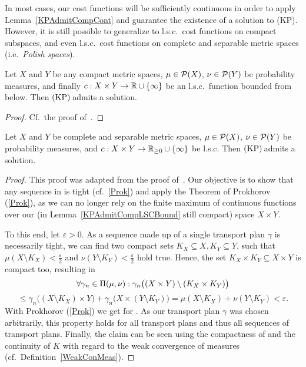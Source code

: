 In most cases, our cost functions will be sufficiently continuous in order to apply Lemma~\ref{KPAdmitCompCont} and guarantee the existence of a solution to (KP). However, it is still possible to generalize to l.s.c.\ cost functions on compact subspaces, and even l.s.c.\ cost functions on complete and separable metric spaces (i.e.\ \textit{Polish spaces}).

\begin{lemma}\label{KPAdmitCompLSCBound}
	Let $X$ and $Y$ be any compact metric spaces, $\mu \in \PM{X}$, $\nu \in \PM{Y}$ be probability measures, and finally $\map[c]{X \times Y}{\R \cup \{ \infty \}}$ be an l.s.c.\ function bounded from below. Then$\text{\normalfont\ (KP)\,}$admits a solution.
\end{lemma}

\begin{proof}
	Cf.~the proof of\ \cite[Theorem~1.5]{San2015}.
\end{proof}

\begin{theorem}\label{KPAdmitPolishLSC}
	Let $X$ and $Y$ be complete and separable metric spaces, $\mu \in \PM{X}$, $\nu \in \PM{Y}$ be probability measures, and $\map[c]{X \times Y}{\RZero \cup \{ \infty \}}$ be l.s.c. Then$\text{\normalfont\ (KP)\,}$admits a solution.
\end{theorem}

\begin{proof}
	This proof was adapted from the proof of\ \cite[Theorem~1.7]{San2015}. Our objective is to show that any sequence in \TP{\mu}{\nu} is tight (cf.\ \ref{Prok}) and apply the Theorem of Prokhorov (\ref{Prok}), as we can no longer rely on the finite maximum of continuous functions over our (in Lemma~\ref{KPAdmitCompLSCBound} still compact) space $X \times Y$.

	To this end, let $\varepsilon > 0$. As a sequence made up of a single transport plan $\gamma$ is necessarily tight, we can find two compact sets $K_X \subseteq X, K_Y \subseteq Y$, such that $\mu(X \setminus K_X) < \frac{\varepsilon}{2}$ and $\nu(Y \setminus K_Y) < \frac{\varepsilon}{2}$ hold true. Hence, the set $K_X \times K_Y \subseteq X \times Y$ is compact too, resulting in
	\[ \forall \gamma_n \in \TP{\mu}{\nu}: \gamma_n\big( (X \times Y) \setminus (K_X \times K_Y) \big) \]
	\[ \le \gamma_n\big( (X \setminus K_X) \times Y \big) + \gamma_n\big( X \times (Y \setminus K_Y) \big) = \mu(X \setminus K_X) + \nu(Y \setminus K_Y) < \varepsilon. \]
	With Prokhorov (\ref{Prok}) we get  for \Ninf. As our transport plan $\gamma$ was chosen arbitrarily, this property holds for all transport plans and thus all sequences of transport plans. Finally, the claim can be seen using the compactness of \TP{\mu}{\nu} and the continuity of $K$ with regard to the weak convergence of measures (cf.\ Definition~\ref{WeakConMeas}).
\end{proof}

